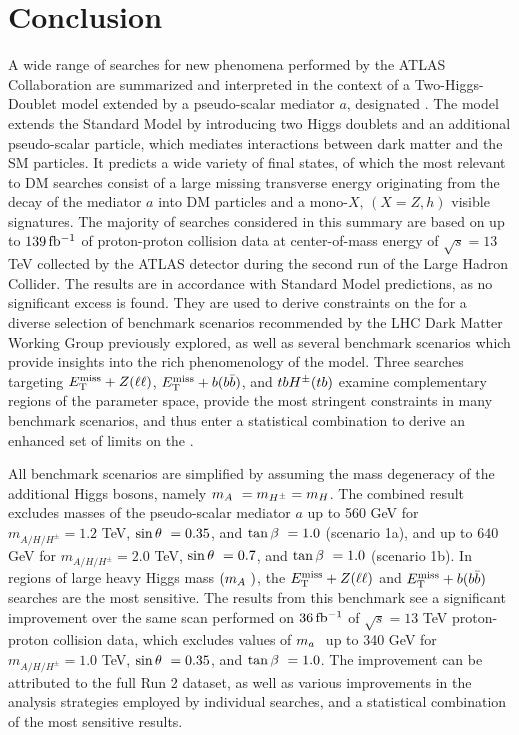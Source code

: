 \section{Conclusion}

A wide range of searches for new phenomena performed by the ATLAS Collaboration are summarized and interpreted in the context of a Two-Higgs-Doublet model extended by a pseudo-scalar mediator $a$, designated \hdma. The model extends the Standard Model by introducing two Higgs doublets and an additional pseudo-scalar particle, which mediates interactions between dark matter and the SM particles. It predicts a wide variety of final states, of which the most relevant to DM searches consist of a large missing transverse energy originating from the decay of the mediator $a$ into DM particles and a mono-$X,\,(X=Z,h)$ visible signatures. The majority of searches considered in this summary are based on up to $139\,\mbox{fb\(^{-1}\)}$ of proton-proton collision data at center-of-mass energy of $\sqrt{s}=13$ TeV collected by the ATLAS detector during the second run of the Large Hadron Collider. The results are in accordance with Standard Model predictions, as no significant excess is found. They are used to derive constraints on the \thdma for a diverse selection of benchmark scenarios recommended by the LHC Dark Matter Working Group previously explored, as well as several benchmark scenarios which provide insights into the rich phenomenology of the model. Three searches targeting $E_{\mathrm{T}}^{\mathrm{miss}}+Z(\ell\ell)$, $E_{\mathrm{T}}^{\mathrm{miss}}+b(b\bar{b})$, and $tbH^{\pm}(tb)$ examine complementary regions of the parameter space, provide the most stringent constraints in many benchmark scenarios, and thus enter a statistical combination to derive an enhanced set of limits on the \hdma. 

All benchmark scenarios are simplified by assuming the mass degeneracy of the additional Higgs bosons, namely $m_A~=m_{H^{\pm}}=m_H$. The combined result excludes masses of the pseudo-scalar mediator $a$ up to 560 GeV for $m_{A/H/H^{\pm}}=1.2$ TeV, $\sin\theta~=0.35$, and $\tan\beta~=1.0$ (scenario 1a), and up to $640$ GeV for $m_{A/H/H^{\pm}}=2.0$ TeV, $\sin\theta~=0.7$, and $\tan\beta~=1.0$ (scenario 1b). In regions of large heavy Higgs mass $(m_A~)$, the $E_{\mathrm{T}}^{\mathrm{miss}}+Z(\ell\ell)$ and $E_{\mathrm{T}}^{\mathrm{miss}}+b(b\bar{b})$ searches are the most sensitive. The results from this benchmark see a significant improvement over the same scan performed on $36\,\mbox{fb\(^{-1}\)}$ of $\sqrt{s}=13$ TeV proton-proton collision data, which excludes values of $m_a~$ up to 340 GeV for $m_{A/H/H^{\pm}}=1.0$ TeV, $\sin\theta~=0.35$, and $\tan\beta~=1.0$. The improvement can be attributed to the full Run 2 dataset, as well as various improvements in the analysis strategies employed by individual searches, and a statistical combination of the most sensitive results.

